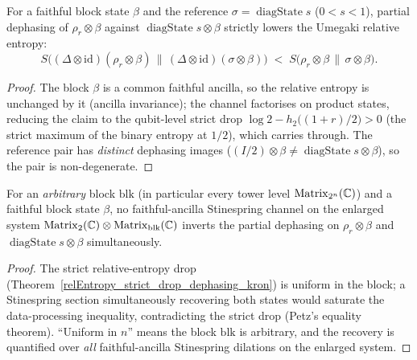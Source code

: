 \begin{theorem}\label{relEntropy_strict_drop_dephasing_kron}
  \leanok
  For a faithful block state \(\beta\) and the reference \(\sigma = \operatorname{diagState} s\)
  (\(0 < s < 1\)), partial dephasing of \(\rho_r\otimes\beta\) against
  \(\operatorname{diagState} s\otimes\beta\) strictly lowers the Umegaki relative entropy:
  \[
    S\bigl((\Delta\otimes\mathrm{id})(\rho_r\otimes\beta)\,\big\|\,(\Delta\otimes\mathrm{id})(\sigma\otimes\beta)\bigr)
      \;<\; S\bigl(\rho_r\otimes\beta\,\big\|\,\sigma\otimes\beta\bigr).
  \]
\end{theorem}
\begin{proof}\leanok
  The block \(\beta\) is a common faithful ancilla, so the relative entropy is unchanged by it
  (ancilla invariance); the channel factorises on product states, reducing the claim to the
  qubit-level strict drop \(\log 2 - h_2\!\big((1+r)/2\big) > 0\) (the strict maximum of the binary
  entropy at \(1/2\)), which carries through. The reference pair has \emph{distinct} dephasing images
  (\((I/2)\otimes\beta \ne \operatorname{diagState} s\otimes\beta\)), so the pair is non-degenerate.
\end{proof}

\begin{theorem}\label{quantum_seal_dephase_kron_faithful}
  \leanok
  For an \emph{arbitrary} block \(\mathrm{blk}\) (in particular every tower level
  \(\operatorname{Matrix}_{2^{n}}(\mathbb{C})\)) and a faithful block state \(\beta\), no faithful-ancilla Stinespring
  channel on the enlarged system \(\operatorname{Matrix}_2(\mathbb{C})\otimes\operatorname{Matrix}_{\mathrm{blk}}(\mathbb{C})\) inverts the
  partial dephasing on \(\rho_r\otimes\beta\) and \(\operatorname{diagState} s\otimes\beta\)
  simultaneously.
\end{theorem}
\begin{proof}\leanok
  The strict relative-entropy drop (Theorem~\ref{relEntropy_strict_drop_dephasing_kron}) is uniform in
  the block; a Stinespring section simultaneously recovering both states would saturate the
  data-processing inequality, contradicting the strict drop (Petz's equality theorem). ``Uniform in
  \(n\)'' means the block \(\mathrm{blk}\) is arbitrary, and the recovery is quantified over
  \emph{all} faithful-ancilla Stinespring dilations on the enlarged system.
\end{proof}

